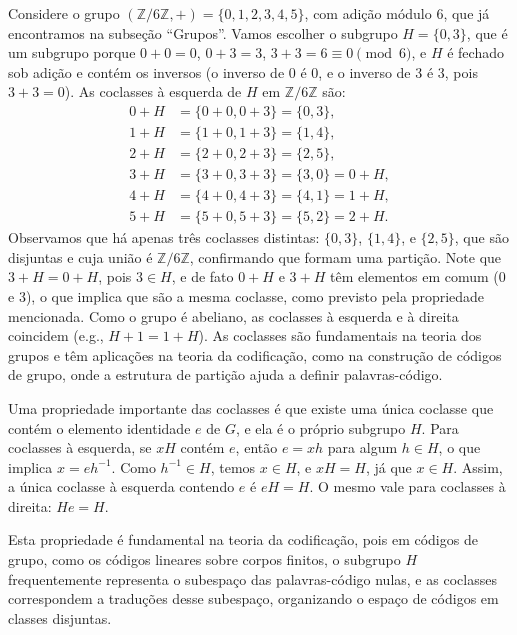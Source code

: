 \begin{example}
Considere o grupo $(\mathbb{Z}/6\mathbb{Z}, +) = \{0, 1, 2, 3, 4, 5\}$, com
adição módulo 6, que já encontramos na subseção ``Grupos''. Vamos escolher o
subgrupo $H = \{0, 3\}$, que é um subgrupo porque $0 + 0 = 0$, $0 + 3 = 3$,
$3 + 3 = 6 \equiv 0 \pmod{6}$, e $H$ é fechado sob adição e
contém os inversos (o inverso de 0 é 0, e o inverso de 3 é 3, pois $3 + 3 = 0$).
As coclasses à esquerda de $H$ em $\mathbb{Z}/6\mathbb{Z}$ são:
\begin{subequations}
  \begin{align}
    0 + H &= \{0+0, 0+3\} = \{0, 3\},\\
    1 + H &= \{1+0, 1+3\} = \{1, 4\},\\
    2 + H &= \{2+0, 2+3\} = \{2, 5\},\\
    3 + H &= \{3+0, 3+3\} = \{3, 0\} = 0 + H,\\
    4 + H &= \{4+0, 4+3\} = \{4, 1\} = 1 + H,\\
    5 + H &= \{5+0, 5+3\} = \{5, 2\} = 2 + H.
  \end{align}
\end{subequations}
Observamos que há apenas três coclasses distintas: $\{0, 3\}$, $\{1, 4\}$,
e $\{2, 5\}$, que são disjuntas e cuja união é $\mathbb{Z}/6\mathbb{Z}$,
confirmando que formam uma partição. Note que $3 + H = 0 + H$, pois 
$3 \in H$, e de fato $0 + H$ e $3 + H$ têm
elementos em comum (0 e 3), o que implica que são a mesma coclasse, como
previsto pela propriedade mencionada. Como o grupo é abeliano, as coclasses à
esquerda e à direita coincidem (e.g., $H + 1 = 1 + H$). As coclasses são
fundamentais na teoria dos grupos e têm aplicações na teoria da codificação,
como na construção de códigos de grupo, onde a estrutura de partição ajuda a
definir palavras-código.
\end{example}


\begin{remark}
Uma propriedade importante das coclasses é que existe uma única coclasse que
contém o elemento identidade $e$ de $G$, e ela é o próprio subgrupo
$H$. Para coclasses à esquerda, se $xH$ contém $e$, então $e = xh$
para algum $h \in H$, o que implica $x = e h^{-1}$. Como $h^{-1} \in H$,
temos $x \in H$, e $xH = H$, já que $x \in H$.
Assim, a única coclasse à esquerda contendo $e$ é $eH = H$. O mesmo
vale para coclasses à direita: $He = H$. 
\end{remark}

Esta propriedade é fundamental
na teoria da codificação, pois em códigos de grupo, como os códigos lineares
sobre corpos finitos, o subgrupo $H$ frequentemente representa o
subespaço das palavras-código nulas, e as coclasses correspondem a traduções
desse subespaço, organizando o espaço de códigos em classes disjuntas.


